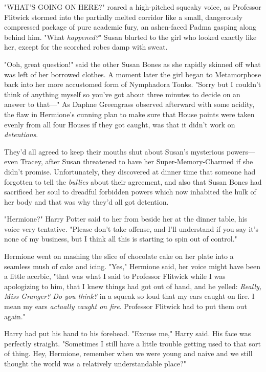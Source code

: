 "WHAT'S GOING ON HERE?" roared a high-pitched squeaky voice, as Professor
Flitwick stormed into the partially melted corridor like a small, dangerously
compressed package of pure academic fury, an ashen-faced Padma gasping along
behind him.
\later
"What \emph{happened?}" Susan blurted to the girl who looked exactly like her,
except for the scorched robes damp with sweat.

"Ooh, great question!" said the other Susan Bones as she rapidly skinned off
what was left of her borrowed clothes. A moment later the girl began to
Metamorphose back into her more accustomed form of Nymphadora Tonks. "Sorry but
I couldn't think of anything myself so you've got about three minutes to decide
on an answer to that---"
\later
As Daphne Greengrass observed afterward with some acidity, the flaw in
Hermione's cunning plan to make sure that House points were taken evenly from
all four Houses if they got caught, was that it didn't work on
\emph{detentions}.

They'd all agreed to keep their mouths shut about Susan's mysterious
powers---even Tracey, after Susan threatened to have her Super-Memory-Charmed
if she didn't promise. Unfortunately, they discovered at dinner time that
someone had forgotten to tell the \emph{bullies} about their agreement, and
also that Susan Bones had sacrificed her soul to dreadful forbidden powers
which now inhabited the hulk of her body and that was why they'd all got
detention.

"Hermione?" Harry Potter said to her from beside her at the dinner table, his
voice very tentative. "Please don't take offense, and I'll understand if you
say it's none of my business, but I think all this is starting to spin out of
control."

Hermione went on mashing the slice of chocolate cake on her plate into a
seamless mush of cake and icing. "Yes," Hermione said, her voice might have
been a little acerbic, "that was what I said to Professor Flitwick while I was
apologizing to him, that I knew things had got out of hand, and he yelled:
\emph{Really, Miss Granger? Do you think?} in a squeak so loud that my ears
caught on fire. I mean my ears \emph{actually caught on fire}. Professor
Flitwick had to put them out again."

Harry had put his hand to his forehead. "Excuse me," Harry said. His face was
perfectly straight. "Sometimes I still have a little trouble getting used to
that sort of thing. Hey, Hermione, remember when we were young and naive and we
still thought the world was a relatively understandable place?"

